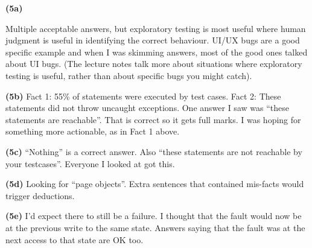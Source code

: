 \documentclass[11pt,onecolumn,letterpaper]{article}
\newcounter{qNum}
\newcommand{\q}[1]{%
\textbf{(#1)}\stepcounter{qNum}}
\begin{document}
\q{5a}

Multiple acceptable answers, but exploratory testing is most useful
where human judgment is useful in identifying the correct
behaviour. UI/UX bugs are a good specific example and when I was
skimming answers, most of the good ones talked about UI bugs.  (The
lecture notes talk more about situations where exploratory testing is
useful, rather than about specific bugs you might catch).

\q{5b}
Fact 1: 55\% of statements were executed by test cases. Fact 2: These statements
did not throw uncaught exceptions.
One answer I saw was ``these statements are reachable''. That is correct so it
gets full marks. I was hoping for something more actionable, as in Fact 1 above.

\q{5c}
``Nothing'' is a correct answer. Also ``these statements are not reachable by your testcases''. Everyone I looked at got this.

\q{5d}
Looking for ``page objects''. Extra sentences that contained mis-facts would trigger deductions.

\q{5e}
I'd expect there to still be a failure. I thought that the fault would now be at the previous
write to the same state. Answers saying that the fault was at the next access to that
state are OK too.




  
  
    
    
 
    

\end{document}
